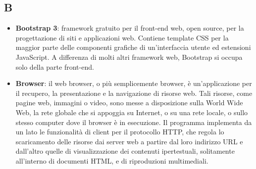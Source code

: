 \subsection{B}
\begin{itemize} 
		\item \textbf{Bootstrap 3}: framework gratuito per il front-end web, open source, per la progettazione di siti e applicazioni web. Contiene template CSS per la maggior parte delle componenti grafiche di un'interfaccia utente ed estensioni JavaScript. A differenza di molti altri framework web, Bootstrap si occupa solo della parte front-end.
	
	\item
	\textbf{Browser}: il web browser, o più semplicemente browser, è un'applicazione per il recupero, la presentazione e la navigazione di risorse web. Tali risorse, come pagine web, immagini o video, sono messe a disposizione sulla World Wide Web, la rete globale che si appoggia su Internet, o su una rete locale, o sullo stesso computer dove il browser è in esecuzione. Il programma implementa da un lato le funzionalità di client per il protocollo HTTP, che regola lo scaricamento delle risorse dai server web a partire dal loro indirizzo URL e dall'altro quelle di visualizzazione dei contenuti ipertestuali, solitamente all'interno di documenti HTML, e di riproduzioni multimediali.
\end{itemize}